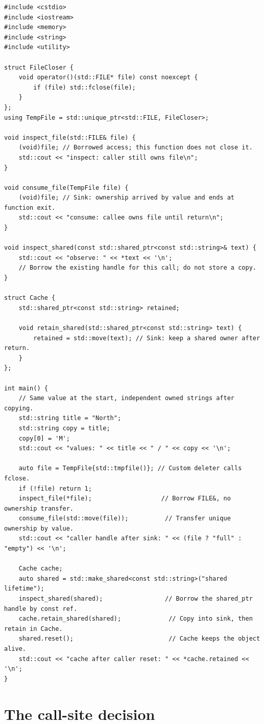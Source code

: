 \begin{verbatim}
#include <cstdio>
#include <iostream>
#include <memory>
#include <string>
#include <utility>

struct FileCloser {
    void operator()(std::FILE* file) const noexcept {
        if (file) std::fclose(file);
    }
};
using TempFile = std::unique_ptr<std::FILE, FileCloser>;

void inspect_file(std::FILE& file) {
    (void)file; // Borrowed access; this function does not close it.
    std::cout << "inspect: caller still owns file\n";
}

void consume_file(TempFile file) {
    (void)file; // Sink: ownership arrived by value and ends at function exit.
    std::cout << "consume: callee owns file until return\n";
}

void inspect_shared(const std::shared_ptr<const std::string>& text) {
    std::cout << "observe: " << *text << '\n';
    // Borrow the existing handle for this call; do not store a copy.
}

struct Cache {
    std::shared_ptr<const std::string> retained;

    void retain_shared(std::shared_ptr<const std::string> text) {
        retained = std::move(text); // Sink: keep a shared owner after return.
    }
};

int main() {
    // Same value at the start, independent owned strings after copying.
    std::string title = "North";
    std::string copy = title;
    copy[0] = 'M';
    std::cout << "values: " << title << " / " << copy << '\n';

    auto file = TempFile{std::tmpfile()}; // Custom deleter calls fclose.
    if (!file) return 1;
    inspect_file(*file);                   // Borrow FILE&, no ownership transfer.
    consume_file(std::move(file));          // Transfer unique ownership by value.
    std::cout << "caller handle after sink: " << (file ? "full" : "empty") << '\n';

    Cache cache;
    auto shared = std::make_shared<const std::string>("shared lifetime");
    inspect_shared(shared);                 // Borrow the shared_ptr handle by const ref.
    cache.retain_shared(shared);             // Copy into sink, then retain in Cache.
    shared.reset();                          // Cache keeps the object alive.
    std::cout << "cache after caller reset: " << *cache.retained << '\n';
}
\end{verbatim}

\section{The call-site decision}\label{01-foundations-i-ch003-the-call-site-decision}

